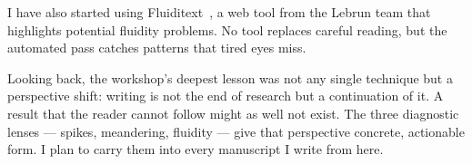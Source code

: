 \documentclass[journal]{IEEEtran}
\begin{document}
I have also started using Fluiditext~\cite{kinnunen2012swan}, a web tool from the Lebrun team that highlights potential fluidity problems. No tool replaces careful reading, but the automated pass catches patterns that tired eyes miss.

Looking back, the workshop's deepest lesson was not any single technique but a perspective shift: writing is not the end of research but a continuation of it. A result that the reader cannot follow might as well not exist. The three diagnostic lenses --- spikes, meandering, fluidity --- give that perspective concrete, actionable form. I plan to carry them into every manuscript I write from here.



\end{document}
